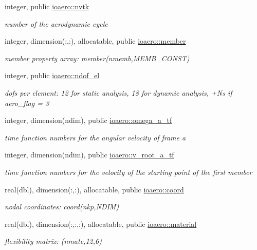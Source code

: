 \begin{DoxyCompactItemize}
integer, public \hyperlink{namespaceioaero_a29c506d8ad3a3609366b35e7e4c00fa4}{ioaero\+::nvtk}
\begin{DoxyCompactList}\small\item\em number of the aerodynamic cycle \end{DoxyCompactList}\item 
integer, dimension(\+:,\+:), allocatable, public \hyperlink{namespaceioaero_ae040b39fe109c45b001985415e230ec3}{ioaero\+::member}
\begin{DoxyCompactList}\small\item\em member property array\+: member(nmemb,\+M\+E\+M\+B\+\_\+\+C\+O\+N\+S\+T) \end{DoxyCompactList}\item 
integer, public \hyperlink{namespaceioaero_a2b095b5cb5aab1f100d202c8004c9cb5}{ioaero\+::ndof\+\_\+el}
\begin{DoxyCompactList}\small\item\em dofs per element\+: 12 for static analysis, 18 for dynamic analysis, +\+Ns if aero\+\_\+flag = 3 \end{DoxyCompactList}\item 
integer, dimension(ndim), public \hyperlink{namespaceioaero_a9ec25357ecfc1c09628efa147300aaee}{ioaero\+::omega\+\_\+a\+\_\+tf}
\begin{DoxyCompactList}\small\item\em time function numbers for the angular velocity of frame a \end{DoxyCompactList}\item 
integer, dimension(ndim), public \hyperlink{namespaceioaero_adb4e11942a388b1bf1f13d10c79614bc}{ioaero\+::v\+\_\+root\+\_\+a\+\_\+tf}
\begin{DoxyCompactList}\small\item\em time function numbers for the velocity of the starting point of the first member \end{DoxyCompactList}\item 
real(dbl), dimension(\+:,\+:), allocatable, public \hyperlink{namespaceioaero_ad67cddc00712c4d5a6d4008b2fe6c452}{ioaero\+::coord}
\begin{DoxyCompactList}\small\item\em nodal coordinates\+: coord(nkp,\+N\+D\+I\+M) \end{DoxyCompactList}\item 
real(dbl), dimension(\+:,\+:,\+:), allocatable, public \hyperlink{namespaceioaero_a83ca534029c39300d045045432607a69}{ioaero\+::material}
\begin{DoxyCompactList}\small\item\em flexibility matrix\+: (nmate,12,6) \end{DoxyCompactList}\item 

\end{DoxyCompactItemize}
